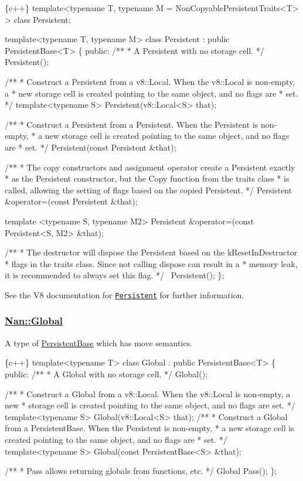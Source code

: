 \begin{DoxyCode}
\{c++\}
template<typename T, typename M = NonCopyablePersistentTraits<T> >
class Persistent;

template<typename T, typename M> class Persistent : public PersistentBase<T> \{
 public:
 /**
  * A Persistent with no storage cell.
  */
  Persistent();

  /**
   * Construct a Persistent from a v8::Local. When the v8::Local is non-empty, a
   * new storage cell is created pointing to the same object, and no flags are
   * set.
   */
  template<typename S> Persistent(v8::Local<S> that);

  /**
   * Construct a Persistent from a Persistent. When the Persistent is non-empty,
   * a new storage cell is created pointing to the same object, and no flags are
   * set.
   */
  Persistent(const Persistent &that);

  /**
   * The copy constructors and assignment operator create a Persistent exactly
   * as the Persistent constructor, but the Copy function from the traits class
   * is called, allowing the setting of flags based on the copied Persistent.
   */
  Persistent &operator=(const Persistent &that);

  template <typename S, typename M2>
  Persistent &operator=(const Persistent<S, M2> &that);

  /**
   * The destructor will dispose the Persistent based on the kResetInDestructor
   * flags in the traits class.  Since not calling dispose can result in a
   * memory leak, it is recommended to always set this flag.
   */
  ~Persistent();
\};
\end{DoxyCode}


See the V8 documentation for \href{https://v8docs.nodesource.com/io.js-3.0/d2/d78/classv8_1_1_persistent.html}{\tt {\ttfamily Persistent}} for further information.

\label{_api_nan_global}%
 \subsubsection*{\hyperlink{class_nan_1_1_global}{Nan\+::\+Global}}

A type of {\ttfamily \hyperlink{class_persistent_base}{Persistent\+Base}} which has move semantics.


\begin{DoxyCode}
\{c++\}
template<typename T> class Global : public PersistentBase<T> \{
 public:
  /**
   * A Global with no storage cell.
   */
  Global();

  /**
   * Construct a Global from a v8::Local. When the v8::Local is non-empty, a new
   * storage cell is created pointing to the same object, and no flags are set.
   */
  template<typename S> Global(v8::Local<S> that);
  /**
   * Construct a Global from a PersistentBase. When the Persistent is non-empty,
   * a new storage cell is created pointing to the same object, and no flags are
   * set.
   */
  template<typename S> Global(const PersistentBase<S> &that);

  /**
   * Pass allows returning globals from functions, etc.
   */
  Global Pass();
\};
\end{DoxyCode}


